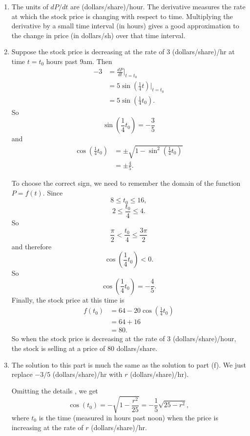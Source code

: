 \documentclass{ximera}
\begin{document}
\begin{question}
\begin{explanation}
\begin{enumerate}
\item The units of $dP/dt$ are (dollars/share)/hour. The derivative measures the rate at which the stock price is changing with respect to time. Multiplying the derivative by a small time interval (in hours) gives a good approximation to the change in price (in dollars/sh) over that time interval.

\item Suppose the stock price is decreasing at the rate of 3 (dollars/share)/hr at time $t=t_0$ hours past 9am.
Then
\begin{align*}
  -3  &= \frac{dP}{dt}\Big|_{t=t_0} \\
       &=  5 \sin \left(  \frac{1}{4} t \right)\Big|_{t=t_0} \\
                                         &= 5 \sin \left(  \frac{1}{4} t_0 \right) .
\end{align*}
So
\[
           \sin \left(  \frac{1}{4} t_0 \right) = -\frac{3}{5}
\]
and
\begin{align*}
  \cos \left(  \frac{1}{4} t_0 \right) &= \pm \sqrt{1 - \sin^2 \left(  \frac{1}{4} t_0 \right)} \\
                                                  &= \pm \frac{4}{5} .
\end{align*}

To choose the correct sign, we need to remember the domain of the function $P=f(t)$. Since 
\[
    8 \leq t_0 \leq 16 ,
\]
\[
  2 \leq \frac{t_0}{4} \leq 4 .
\]
So
\[
     \frac{\pi}{2} < \frac{t_0}{4} \leq  \frac{3\pi}{2}
\]
and therefore
\[
  \cos \left(  \frac{1}{4} t_0 \right) < 0.
\]
So
\[
    \cos \left(  \frac{1}{4} t_0 \right) = - \frac{4}{5}.
\] 
Finally, the stock price at this time is
\begin{align*}
    f(t_0) &= 64 - 20\cos\left(  \frac{1}{4} t_0 \right) \\
             &= 64 + 16 \\
             &= 80.
\end{align*}
So when the stock price is decreasing at the rate of $3$ (dollars/share)/hour, the stock is selling at a price of $80$ dollars/share.

\item The solution to this part is much the same as the solution to part (f). We just replace $-3/5$ (dollars/share)/hr with $r$ (dollars/share)/hr).

Omitting the details , we get
\[
      \cos (t_0) = -\sqrt{1-\frac{r^2}{25}} = -\frac{1}{5}\sqrt{25 - r^2},
\]
where $t_0$ is the time (measured in hours past noon) when the price is increasing at the rate of $r$ (dollars/share)/hr. 


\end{enumerate}
\end{explanation}
\end{question}
\end{document}
